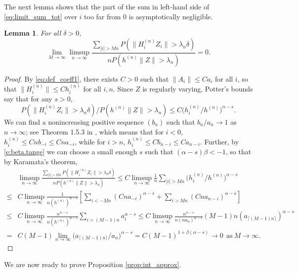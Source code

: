 \documentclass[11pt,reqno]{amsart}
\numberwithin{equation}{section}
\newtheorem{lemma}{Lemma}[section] %
\theoremstyle{definition}
\theoremstyle{remark}
\theoremstyle{definition}
\begin{document}
The next lemma shows that the part of the sum in left-hand side of
\eqref{eq:limit_sum_tot} over $i$ too far from 0 is asymptotically negligible. 
\begin{lemma}\label{lemma:intapprox_negligible}
 For all $\delta > 0$, 
    $$\lim_{M\to \infty} \limsup_{n\to \infty}  \frac{\sum_{|i|> Mn}
      P(\|{H_i^{(n)}}Z_i\| > \lambda_n \delta)}{nP(h^{(n)} \|Z\| >
      \lambda_n)}= 0.$$ 
\end{lemma}
\begin{proof}
By \eqref{eq:def_coeff1}, there exists $C> 0$ such that
$\|A_i\|\leq Ca_i$ for all $i$, so that $\|H_i^{(n)}\|\leq Ch_i^{(n)}$
for all $i, n$. Since $Z$ is regularly varying, Potter's bounds say
that for any $s>0$, 
$$P(\|{H_{i}^{(n)}} Z_i\| > \lambda_n \delta)/P(h^{(n)}\|Z\|>
\lambda_n)  \leq C \bigl(h_{i}^{(n)}/h^{(n)}\bigr)^{\alpha - s}.$$
We can find a nonincreasing positive sequence $(b_n)$ such that $b_n/a_n\to
1$ as $n\to\infty$; see Theorem 1.5.3 in
\cite{bingham:goldie:teugels:1989}, which means that for $i<0$, 
$h_i^{(n)}\leq Cnb_{-i}\leq Cna_{-i}$, while for $i>n$, $h_i^{(n)}\leq
Cb_{n-i}\leq Ca_{n-i}$.  Further, by \eqref{e:beta.tange} 
 we can choose a small enough $s$ such that $(\alpha - s)\beta < -1$,
so that by Karamata's theorem, 
\begin{align*}
&\limsup_{n\to \infty} \frac{\sum_{|i|> Mn} P(\|{H_i^{(n)}} Z_i\| >
                 \lambda_n \delta)}{n P(h^{(n)}\|Z\|> \lambda_n)}\leq
                 C    \limsup_{n\to \infty} \frac{1}{n}\sum_{|i|> Mn}\bigl(h_{i}^{(n)}/h^{(n)}\bigr)^{\alpha - s}\\
  \leq &  C    \limsup_{n\to \infty} \frac{1}{n(h^{(n)})^{\alpha-s}}
         \left[ \sum_{i<-Mn}
         (Cna_{-i})^{\alpha-s}+
         \sum_{i>Mn} (Cna_{n-i})^{\alpha-s} \right] \\
\leq & C \limsup_{n\to \infty} \frac{n^{\alpha-s}}{n(h^{(n)})^{\alpha-s}}\sum_{i>(M-1)n} a_i^{\alpha-s}
\leq C \limsup_{n\to \infty}
       \frac{n^{\alpha-s}}{n(na_{n})^{\alpha-s}}(M-1)n (a_{\lceil (M-1)n\rceil})^{\alpha-s}\\
=& C(M-1)\lim_{n\to\infty} \bigl(a_{\lceil
   (M-1)n\rceil}/a_n\bigr)^{\alpha-s}=C(M-1)^{1+\beta(\alpha-s)} \to 0
   \ \ \text{as} \ M\to\infty.
\end{align*}




\end{proof}

We are now ready to prove Proposition \ref{prop:int_approx}. 
\end{document}
